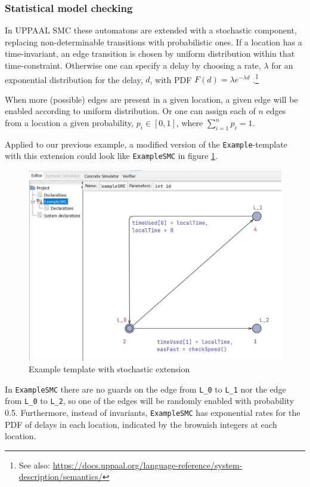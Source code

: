 \subsubsection{Statistical model checking}

In UPPAAL SMC these automatons are extended with a stochastic component, replacing non-determinable transitions with probabilistic ones. If a location has a time-invariant, an edge transition is chosen by uniform distribution within that time-constraint. Otherwise one can specify a delay by choosing a rate, $\lambda$ for an exponential distribution for the delay, $d$, with PDF $F(d)=\lambda e^{-\lambda d}$ \parencite[p. 398]{UPPAALSMC}.\footnote{See also: \url{https://docs.uppaal.org/language-reference/system-description/semantics/}} 

When more (possible) edges are present in a given location, a given edge will be enabled according to uniform distribution. Or one can assign each of $n$ edges from a location a given probability, $p_i \in [0,1]$, where $\sum_{i=1}^n p_i = 1 $. 

Applied to our previous example, a modified version of the \verb|Example|-template with this extension could look like \verb|ExampleSMC| in figure \ref{fig:ex-template-smc}.

\begin{figure}[h]
    \centering
    \includegraphics[width=0.90\linewidth]{pictures/example_model_smc.JPG}
    \caption{Example template with stochastic extension}
    \label{fig:ex-template-smc}
\end{figure}

In \verb|ExampleSMC| there are no guards on the edge from \verb|L_0| to \verb|L_1| nor the edge from \verb|L_0| to \verb|L_2|, so one of the edges will be randomly enabled with probability 0.5. Furthermore, instead of invariants, \verb|ExampleSMC| has exponential rates for the PDF of delays in each location, indicated by the brownish integers at each location.

